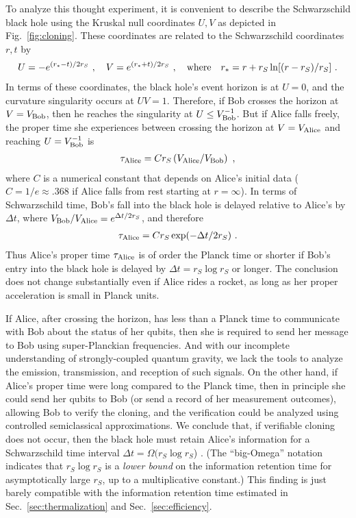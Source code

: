 \documentclass[12pt]{article}
\begin{document}
To analyze this thought experiment, it is convenient to describe the Schwarzschild black hole using the Kruskal null coordinates $U,V$ as depicted in Fig.~\ref{fig:cloning}. These coordinates are related to the Schwarzschild coordinates $r,t$ by
\begin{eqnarray}
U=-e^{(r_*-t)/2r_S}~,\quad V=e^{(r_*+t)/2r_S}~,\quad {\rm where} \quad r_*=r+r_S\ln[(r-r_S)/r_S]~.
\end{eqnarray}
In terms of these coordinates, the black hole's event horizon is at $U=0$, and the curvature singularity occurs at $UV=1$. Therefore, if Bob crosses the horizon at $V=V_{\rm Bob}$, then he reaches the singularity at $U\le V_{\rm Bob}^{-1}$. But if Alice falls freely, the proper time she experiences between crossing the horizon at $V=V_{\rm Alice}$ and reaching $U=V_{\rm Bob}^{-1}$ is 
\begin{eqnarray}
\tau_{\rm Alice}= Cr_S\left({V_{\rm Alice}}/{V_{\rm Bob}}\right)~,
\end{eqnarray}
where $C$ is a numerical constant that depends on Alice's initial data ($C=1/e\approx .368$ if Alice falls from rest starting at $r=\infty$). In terms of Schwarzschild time, Bob's fall into the black hole is delayed relative to Alice's by $\Delta t$, where $V_{\rm Bob}/V_{\rm Alice}= e^{\Delta t/2r_S}$, and therefore
\begin{eqnarray}
\tau_{\rm Alice}= C  r_S\exp(-\Delta t/2r_S)~.
\end{eqnarray}
Thus Alice's proper time $\tau_{\rm Alice}$ is of order the Planck time or shorter if Bob's entry into the black hole is delayed by $\Delta t = r_S\log r_S$ or longer. The conclusion does not change substantially even if Alice rides a rocket, as long as her proper acceleration is small in Planck units. 

If Alice, after crossing the horizon, has less than a Planck time to communicate with Bob about the status of her qubits, then she is required to send her message to Bob using super-Planckian frequencies. And with our incomplete understanding of strongly-coupled quantum gravity, we lack the tools to analyze the emission, transmission, and reception of such signals. On the other hand, if Alice's proper time were long compared to the Planck time, then in principle she could send her qubits to Bob (or send a record of her measurement outcomes), allowing Bob to verify the cloning, and the verification could be analyzed using controlled semiclassical approximations. We conclude that, if verifiable cloning does not occur, then the black hole must retain Alice's information for a Schwarzschild time interval $\Delta t=\Omega(r_S\log r_S$) \cite{susskind-gedanken,preskill-unpublished}. (The ``big-Omega'' notation indicates that $r_S\log r_S$ is a {\em lower bound} on the information retention time for asymptotically large $r_S$, up to a multiplicative constant.) This finding is just barely compatible with the information retention time estimated in Sec.~\ref{sec:thermalization} and Sec.~\ref{sec:efficiency}.
\end{document}
